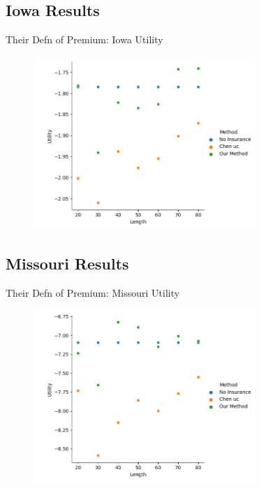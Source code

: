 \documentclass{beamer}
\begin{document}
\subsection*{Iowa Results}
\begin{frame}{Their Defn of Premium: Iowa Utility}
    \begin{figure}
        \includegraphics[width=0.75\textwidth]{../../../output/figures/Chen Premium/Iowa_Utility_Length_ml1241.png}
    \end{figure}
\end{frame}

\subsection*{Missouri Results}
\begin{frame}{Their Defn of Premium: Missouri Utility}
    \begin{figure}
        \includegraphics[width=0.75\textwidth]{../../../output/figures/Chen Premium/Missouri_Utility_Length_ml1241.png}
    \end{figure}
\end{frame}
\end{document}
